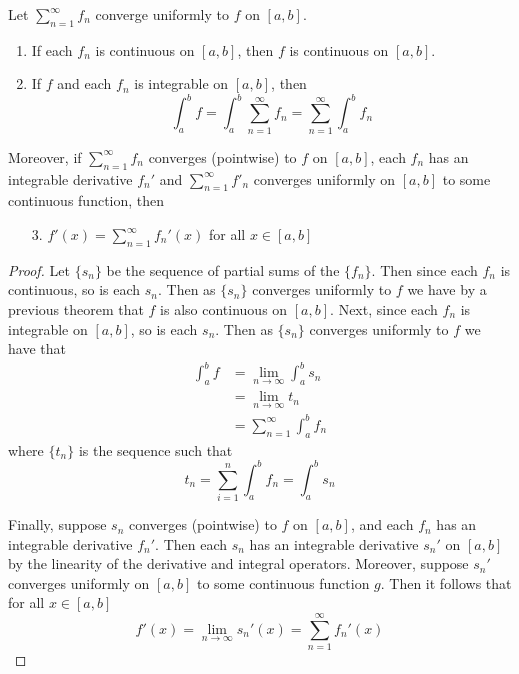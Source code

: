 \begin{cor}
    Let $\sum\limits_{n=1}^{\infty}f_n$ converge uniformly to $f$ on $[a,b]$. \begin{enumerate}
        \item If each $f_n$ is continuous on $[a,b]$, then $f$ is continuous on $[a,b]$.
        \item If $f$ and each $f_n$ is integrable on $[a,b]$, then \begin{equation*}
                \int_a^bf = \int_a^b\sum_{n=1}^{\infty}f_n = \sum\limits_{n=1}^{\infty}\int_a^bf_n
        \end{equation*}
    \end{enumerate}
    Moreover, if $\sum\limits_{n=1}^{\infty}f_n$ converges (pointwise) to $f$ on $[a,b]$, each $f_n$ has an integrable derivative $f_n'$ and $\sum\limits_{n=1}^{\infty}f'_n$ converges uniformly on $[a,b]$ to some continuous function, then \begin{enumerate}
        \item[3.] $f'(x) = \sum\limits_{n=1}^{\infty}f_n'(x)$   for all $x \in [a,b]$
    \end{enumerate}
\end{cor}
\begin{proof}
    Let $\{s_n\}$ be the sequence of partial sums of the $\{f_n\}$. Then since each $f_n$ is continuous, so is each $s_n$. Then as $\{s_n\}$ converges uniformly to $f$ we have by a previous theorem that $f$ is also continuous on $[a,b]$. Next, since each $f_n$ is integrable on $[a,b]$, so is each $s_n$. Then as $\{s_n\}$ converges uniformly to $f$ we have that \begin{align*}
        \int_a^bf &= \lim\limits_{n\rightarrow \infty}\int_a^bs_n \\
        &= \lim\limits_{n\rightarrow\infty}t_n \\
        &= \sum\limits_{n=1}^{\infty}\int_a^bf_n
    \end{align*}
    where $\{t_n\}$ is the sequence such that \begin{equation*}
        t_n = \sum\limits_{i=1}^n\int_a^bf_n = \int_a^bs_n
    \end{equation*}

    Finally, suppose $s_n$ converges (pointwise) to $f$ on $[a,b]$, and each $f_n$ has an integrable derivative $f_n'$. Then each $s_n$ has an integrable derivative $s_n'$ on $[a,b]$ by the linearity of the derivative and integral operators. Moreover, suppose $s_n'$ converges uniformly on $[a,b]$ to some continuous function $g$. Then it follows that for all $x \in [a,b]$ \begin{equation*}
        f'(x) = \lim\limits_{n\rightarrow \infty}s_n'(x) = \sum\limits_{n=1}^{\infty}f_n'(x)
    \end{equation*}
\end{proof}

